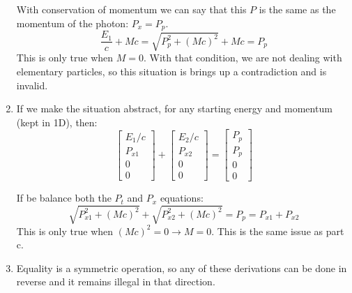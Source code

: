 \documentclass[11pt]{article}
\begin{document}
\begin{enumerate}[label=\alph*)]
        With conservation of momentum we can say that this $P$ is the same as the momentum of the photon: $P_x = P_p$.
        \[\frac{E_1}{c} + Mc = \sqrt{P_p^2+ (Mc)^2} +Mc = P_p\]
        This is only true when $M = 0$. With that condition, we are not dealing with elementary particles, so this situation is brings up a contradiction and is invalid. 
        \item
        If we make the situation abstract, for any starting energy and momentum (kept in 1D), then:\\
        \[\begin{bmatrix}
        E_1/c \\ P_{x1} \\ 0 \\ 0
        \end{bmatrix}
        +
        \begin{bmatrix}
        E_2/c \\ P_{x2} \\ 0 \\ 0
        \end{bmatrix}
        =
        \begin{bmatrix}
        P_p \\ P_p \\ 0 \\ 0
        \end{bmatrix}\]
        
        If be balance both the $P_t$ and $P_x$ equations: 
        \[\sqrt{P_{x1}^2 + (Mc)^2} + \sqrt{P_{x2}^2 + (Mc)^2} = P_p = P_{x1}+P_{x2}\]
        This is only true when $(Mc)^2 = 0 \rightarrow M=0$. This is the same issue as part c. 
        \item
        Equality is a symmetric operation, so any of these derivations can be done in reverse and it remains illegal in that direction. 
    \end{enumerate}
\end{document}
